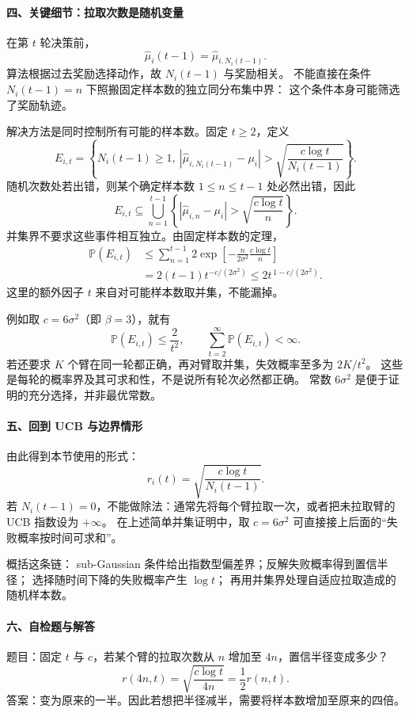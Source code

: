 \documentclass[
  11pt,
  a4paper,
]{ctexart}
\begin{document}
\paragraph{四、关键细节：拉取次数是随机变量}
在第 \(t\) 轮决策前，
\[
\widehat\mu_i(t-1)=
\widehat\mu_{i,N_i(t-1)}.
\]
算法根据过去奖励选择动作，故 \(N_i(t-1)\) 与奖励相关。
不能直接在条件 \(N_i(t-1)=n\) 下照搬固定样本数的独立同分布集中界：
这个条件本身可能筛选了奖励轨迹。

解决方法是同时控制所有可能的样本数。固定 \(t\ge2\)，定义
\[
E_{i,t}=
\left\{N_i(t-1)\ge1,\
|\widehat\mu_{i,N_i(t-1)}-\mu_i|
>\sqrt{\frac{c\log t}{N_i(t-1)}}\right\}.
\]
随机次数处若出错，则某个确定样本数 \(1\le n\le t-1\) 处必然出错，因此
\[
E_{i,t}\subseteq
\bigcup_{n=1}^{t-1}
\left\{|\widehat\mu_{i,n}-\mu_i|
>\sqrt{\frac{c\log t}{n}}\right\}.
\]
并集界不要求这些事件相互独立。由固定样本数的定理，
\[
\begin{aligned}
\mathbb P(E_{i,t})
&\le\sum_{n=1}^{t-1}
2\exp\!\left[-\frac{n}{2\sigma^2}
                  \frac{c\log t}{n}\right]\\
&=2(t-1)t^{-c/(2\sigma^2)}
\le 2t^{\,1-c/(2\sigma^2)}.
\end{aligned}
\]
这里的额外因子 \(t\) 来自对可能样本数取并集，不能漏掉。

例如取 \(c=6\sigma^2\)（即 \(\beta=3\)），就有
\[
\mathbb P(E_{i,t})\le\frac2{t^2},
\qquad
\sum_{t=2}^{\infty}\mathbb P(E_{i,t})<\infty.
\]
若还要求 \(K\) 个臂在同一轮都正确，再对臂取并集，失效概率至多为 \(2K/t^2\)。
这些是每轮的概率界及其可求和性，不是说所有轮次必然都正确。
常数 \(6\sigma^2\) 是便于证明的充分选择，并非最优常数。

\paragraph{五、回到 UCB 与边界情形}
由此得到本节使用的形式：
\[
\boxed{r_i(t)=\sqrt{\frac{c\log t}{N_i(t-1)}}.}
\]
若 \(N_i(t-1)=0\)，不能做除法：通常先将每个臂拉取一次，或者把未拉取臂的 UCB 指数设为 \(+\infty\)。
在上述简单并集证明中，取 \(c=6\sigma^2\) 可直接接上后面的“失败概率按时间可求和”。

概括这条链：
sub-Gaussian 条件给出指数型偏差界；反解失败概率得到置信半径；
选择随时间下降的失败概率产生 \(\log t\)；
再用并集界处理自适应拉取造成的随机样本数。

\paragraph{六、自检题与解答}
题目：固定 \(t\) 与 \(c\)，若某个臂的拉取次数从 \(n\) 增加至 \(4n\)，置信半径变成多少？
\[
r(4n,t)=\sqrt{\frac{c\log t}{4n}}
       =\frac12r(n,t).
\]
答案：变为原来的一半。因此若想把半径减半，需要将样本数增加至原来的四倍。
\end{document}
